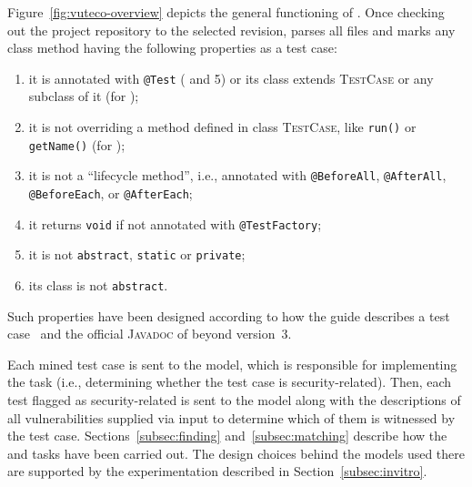 Figure~\ref{fig:vuteco-overview} depicts the general functioning of \vuteco.
Once checking out the project repository to the selected revision,
\vuteco parses all \Java files and marks any class method having the following properties as a test case:
\begin{enumerate}[leftmargin=*]
    \item it is annotated with \texttt{@Test} ( and 5) or its class extends \textsc{TestCase} or any subclass of it (for );
    \item it is not overriding a method defined in class \textsc{TestCase}, like \texttt{run()} or \texttt{getName()} (for );
    \item it is not a ``lifecycle method'', i.e., annotated with \texttt{@BeforeAll}, \texttt{@AfterAll}, \texttt{@BeforeEach}, or \texttt{@AfterEach};
    \item it returns \texttt{void} if not annotated with \texttt{@TestFactory};
    \item it is not \texttt{abstract}, \texttt{static} or \texttt{private};
    \item its class is not \texttt{abstract}.
\end{enumerate}
Such properties have been designed according to how the \JUnit guide describes a test case~\cite{junit:guide} and the official \textsc{Javadoc} of \JUnit beyond version~3.

Each mined test case is sent to the \finder model, which is responsible for implementing the \finding task (i.e., determining whether the test case is security-related).
Then, each test flagged as security-related is sent to the \linker model along with the descriptions of all vulnerabilities supplied via input to determine which of them is witnessed by the test case.
Sections~\ref{subsec:finding} and~\ref{subsec:matching} describe how the \finding and \matching tasks have been carried out.
The design choices behind the models used there are supported by the experimentation described in Section~\ref{subsec:invitro}.

